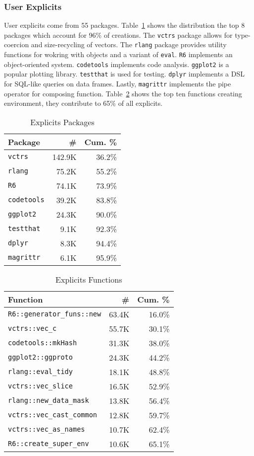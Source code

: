 \documentclass[10pt,review,sigplan,authorversion=true]{acmart}
\renewcommand{\c}[1]{\lstinline |#1|\xspace}
\begin{document}
\subsubsection{User Explicits}

User explicits come from 55 packages. Table~\ref{table:user_explicit_pack} shows
the distribution the top 8 packages which account for 96\% of creations. The
\c{vctrs} package allows for type-coercion and size-recycling of vectors. The
\c{rlang} package provides utility functions for wokring with objects and a
variant of \c{eval}. \c{R6} implements an object-oriented system. \c{codetools}
implements code analysis. \c{ggplot2} is a popular plotting library.
\c{testthat} is used for testing. \c{dplyr} implements a DSL for SQL-like
queries on data frames. Lastly, \c{magrittr} implements the pipe operator for
composing function. Table~\ref{table:user_explicit_fun} shows the top ten
functions creating environment, they contribute to 65\% of all explicits.


\begin{table}[!h]
  \small
  \caption{Explicits Packages} \label{table:user_explicit_pack}
  \centering
  \begin{tabular}{lrr}
    \toprule
    \textbf{Package}&\textbf{\#}&\textbf{Cum. \%}\\
    \midrule
    \c{vctrs}&142.9K&36.2\%\\
    \c{rlang}&75.2K&55.2\%\\
    \c{R6}&74.1K&73.9\%\\
    \c{codetools}&39.2K&83.8\%\\
    \c{ggplot2}&24.3K&90.0\%\\
    \c{testthat}&9.1K&92.3\%\\
    \c{dplyr}&8.3K&94.4\%\\
    \c{magrittr}&6.1K&95.9\%\\
    \bottomrule
  \end{tabular}
\end{table}


\begin{table}[!h]
  \small
  \caption{Explicits Functions} \label{table:user_explicit_fun}
  \centering
  \begin{tabular}{lrr}\toprule
    \textbf{Function}&\textbf{\#}&\textbf{Cum. \%}\\
    \midrule
    \c{R6::generator_funs::new}&63.4K&16.0\%\\
    \c{vctrs::vec_c}&55.7K&30.1\%\\
    \c{codetools::mkHash}&31.3K&38.0\%\\
    \c{ggplot2::ggproto}&24.3K&44.2\%\\
    \c{rlang::eval_tidy}&18.1K&48.8\%\\
    \c{vctrs::vec_slice}&16.5K&52.9\%\\
    \c{rlang::new_data_mask}&13.8K&56.4\%\\
    \c{vctrs::vec_cast_common}&12.8K&59.7\%\\
    \c{vctrs::vec_as_names}&10.7K&62.4\%\\
    \c{R6::create_super_env}&10.6K&65.1\%\\
    \bottomrule
  \end{tabular}
\end{table}
\end{document}
